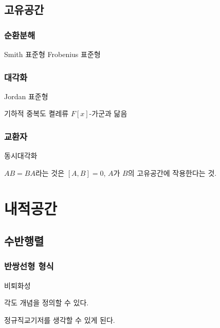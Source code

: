 \documentclass{../../large}
\begin{document}
\chapter{고유공간}



\section{순환분해}
Smith 표준형
Frobenius 표준형




\section{대각화}

Jordan 표준형

기하적 중복도
켤레류
$F[x]$-가군과 닮음


\section{교환자}

동시대각화

$AB=BA$라는 것은 $[A,B]=0$, $A$가 $B$의 고유공간에 작용한다는 것.


\section{}














\part{내적공간}



\chapter{수반행렬}

\section{반쌍선형 형식}

비퇴화성

각도 개념을 정의할 수 있다.

정규직교기저를 생각할 수 있게 된다.
\end{document}
